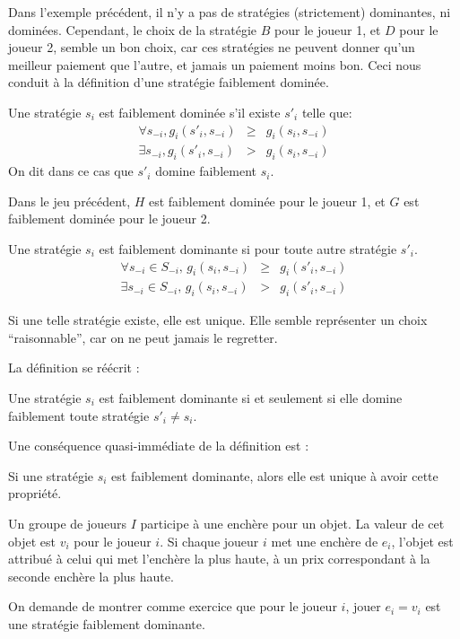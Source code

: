 Dans l'exemple précédent, il n'y a pas de stratégies (strictement)
dominantes, ni dominées. Cependant, le choix de la stratégie $B$
pour le joueur 1, et $D$ pour le joueur 2, semble un bon choix,
car ces stratégies ne peuvent donner qu'un meilleur paiement que
l'autre, et jamais un paiement moins bon. Ceci nous conduit à la
définition d'une stratégie faiblement dominée.

\begin{definition} Une stratégie $s_i$ est faiblement
dominée s'il existe $s'_i$ telle que:
\begin{eqnarray*}
\forall s_{-i}, g_i(s'_i,s_{-i}) &\geq& g_i(s_i,s_{-i})\\
\exists s_{-i}, g_i(s'_i,s_{-i}) &>& g_i(s_i,s_{-i})
\end{eqnarray*}
On dit dans ce cas que $s'_i$ domine faiblement $s_i$.
\end{definition}

Dans le jeu précédent, $H$ est faiblement dominée pour le joueur
1, et $G$ est faiblement dominée pour le joueur 2.

\begin{definition}
Une stratégie $s_i$ est faiblement dominante si pour toute autre
stratégie $s'_i$.
\begin{eqnarray*}
\forall s_{-i}\in S_{-i},\, g_i(s_i,s_{-i}) &\geq &g_i(s'_i,s_{-i})\\
\exists s_{-i}\in S_{-i},\, g_i(s_i,s_{-i}) &> &g_i(s'_i,s_{-i})
\end{eqnarray*}
\end{definition}

Si une telle stratégie existe, elle est unique. Elle semble
représenter un choix ``raisonnable'', car on ne peut jamais le
regretter.

La définition se réécrit :
\begin{proposition} Une stratégie $s_i$ est faiblement dominante si et seulement
si elle domine faiblement toute stratégie $s'_i\neq s_i$.
\end{proposition}

Une conséquence quasi-immédiate de la définition est : %
\begin{proposition}
Si une stratégie $s_i$ est faiblement dominante, alors elle est
unique à avoir cette propriété.
\end{proposition}

\begin{exemple}
Un groupe de joueurs $I$ participe à une enchère pour un objet. La
valeur de cet objet est $v_i$ pour le joueur $i$. Si chaque joueur
$i$ met une enchère de $e_i$, l'objet est attribué à celui qui met
l'enchère la plus haute, à un prix correspondant à la seconde
enchère la plus haute.

On demande de montrer comme exercice que pour le joueur $i$, jouer
$e_i = v_i$ est une stratégie faiblement dominante.
\end{exemple}

